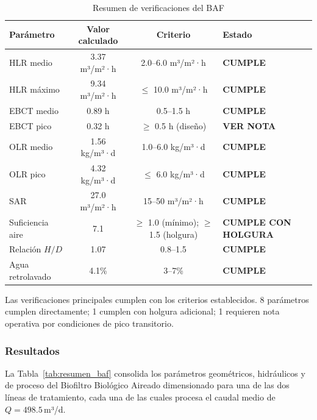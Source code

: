 \documentclass[12pt,a4paper]{article}
\begin{document}
\begin{table}[H]
\centering
\caption{Resumen de verificaciones del BAF}
\label{tab:verif_baf}
\begin{tabular}{lccl}
\toprule
\textbf{Parámetro} & \textbf{Valor calculado} & \textbf{Criterio} & \textbf{Estado} \\
\midrule
HLR medio        & 3.37 m³/m²·h   & 2.0--6.0 m³/m²·h  & \textbf{CUMPLE} \\
HLR máximo       & 9.34 m³/m²·h   & $\leq$ 10.0 m³/m²·h             & \textbf{CUMPLE} \\
EBCT medio       & 0.89 h                   & 0.5--1.5 h                   & \textbf{CUMPLE} \\
EBCT pico        & 0.32 h              & $\geq$ 0.5 h (diseño)             & \textbf{VER NOTA} \\
OLR medio        & 1.56 kg/m³·d   & 1.0--6.0 kg/m³·d & \textbf{CUMPLE} \\
OLR pico         & 4.32 kg/m³·d & $\leq$ 6.0 kg/m³·d          & \textbf{CUMPLE} \\
SAR              & 27.0 m³/m²·h       & 15--50 m³/m²·h  & \textbf{CUMPLE} \\
Suficiencia aire & 7.1      & $\geq$ 1.0 (mínimo); $\geq$ 1.5 (holgura)  & \textbf{CUMPLE CON HOLGURA} \\
Relación $H/D$   & 1.07               & 0.8--1.5          & \textbf{CUMPLE} \\
Agua retrolavado & 4.1\%          & 3--7\%  & \textbf{CUMPLE} \\
\bottomrule
\end{tabular}
\end{table}

Las verificaciones principales cumplen con los criterios establecidos. 8 parámetros cumplen directamente; 1 cumplen con holgura adicional; 1 requieren nota operativa por condiciones de pico transitorio.

\subsubsection{Resultados}

La Tabla~\ref{tab:resumen_baf} consolida los parámetros geométricos, hidráulicos y de proceso del Biofiltro Biológico Aireado dimensionado para una de las dos líneas de tratamiento, cada una de las cuales procesa el caudal medio de $Q = 498.5$\,m³/d.
\end{document}
